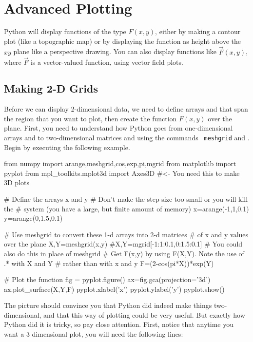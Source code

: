 \chapter{Advanced Plotting}
\label{chap:advancedplots}


Python will display functions of the type $F(x,y)$, either by
making a contour plot (like a topographic map) or by displaying the
function as height above the $xy$ plane like a perspective drawing.
You can also display functions like $\vec{F}(x,y)$, where $\vec{F}$
is a vector-valued function, using vector field plots.

\medskip

\section{Making 2-D Grids}

Before we can display 2-dimensional data, we need to define arrays
 and  that span the region that you want to plot, then create
the function $F(x,y)$ over the plane.  First, you need to understand
how Python goes from
one-dimensional arrays  and  to two-dimensional
matrices  and  using the commands {\tt
meshgrid} and . Begin by executing the following
example.
\begin{codeexample}
\begin{VerbatimOut}{\listingFile}
from numpy import arange,meshgrid,cos,exp,pi,mgrid
from matplotlib import pyplot
from mpl_toolkits.mplot3d import Axes3D  #<- You need this to make 3D plots

# Define the arrays x and y
# Don't make the step size too small or you will kill the
# system (you have a large, but finite amount of memory)
x=arange(-1,1,0.1)
y=arange(0,1.5,0.1)

# Use meshgrid to convert these 1-d arrays into 2-d matrices
# of x and y values over the plane
X,Y=meshgrid(x,y)
#X,Y=mgrid[-1:1:0.1,0:1.5:0.1]  # You could also do this in place of meshgrid
# Get F(x,y) by using F(X,Y). Note the use of .* with X and Y
# rather than with x and y
F=(2-cos(pi*X))*exp(Y)

# Plot the function
fig = pyplot.figure()
ax=fig.gca(projection='3d')
ax.plot_surface(X,Y,F)
pyplot.xlabel('x')
pyplot.ylabel('y')
pyplot.show()
\end{VerbatimOut}
\end{codeexample}
The picture should convince you that Python did indeed make
things two-dimensional, and that this way of plotting could be very
useful. But exactly how Python did it is tricky, so pay close
attention.  First, notice that anytime you want a 3 dimensional plot,
you will need the following lines:

